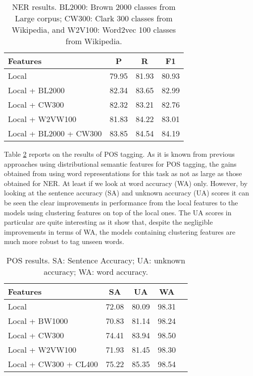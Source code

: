 \documentclass[10pt, a4paper]{article}
\begin{document}
\begin{table}[ht]
  \centering
  \begin{tabular}[ht]{lccc} \hline
    Features & P & R & F1 \\ \hline \hline
    Local & 79.95 & 81.93 & 80.93 \\
    Local + BL2000 & 82.34 & 83.65 & 82.99 \\
    Local + CW300 & 82.32 & 83.21 & 82.76 \\
    Local + W2VW100 & 81.83 & 84.22 & 83.01 \\
    Local + BL2000 + CW300 & 83.85 & 84.54 & 84.19 \\ \hline
  \end{tabular}
  \caption{NER results. BL2000: Brown 2000 classes from Large corpus; CW300: Clark 300 classes from Wikipedia, and W2V100: Word2vec 100 classes from Wikipedia.}
\label{tab:nerresults}
\end{table}

Table \ref{tab:posresults} reports on the results of POS tagging. As it is known from previous approaches using distributional semantic features for POS tagging, the gains obtained from using word representations for this task as not as large as those obtained for NER. At least if we look at word accuracy (WA) only. However, by looking at the sentence accuracy (SA) and unknown accuracy (UA) scores it can be seen the clear improvements in performance from the local features to the models using clustering features on top of the local ones. The UA scores in particular are quite interesting as it show that, despite the negligible improvements in terms of WA, the models containing clustering features are much more robust to tag unseen words.

\begin{table}[ht]
  \centering
  \begin{tabular}[ht]{lcccc} \hline
    Features & SA & UA & WA \\ \hline \hline
    Local & 72.08 & 80.09 & 98.31 \\
    Local + BW1000 & 70.83 & 81.14 & 98.24 \\
    Local + CW300 & 74.41 & 83.94 & 98.50 \\
    Local + W2VW100 & 71.93 & 81.45 & 98.30 \\
    Local + CW300 + CL400 & 75.22 & 85.35 & 98.54 \\ \hline
  \end{tabular}
  \caption{POS results. SA: Sentence Accuracy; UA: unknown accuracy; WA: word accuracy.}
\label{tab:posresults}
\end{table}
\end{document}
